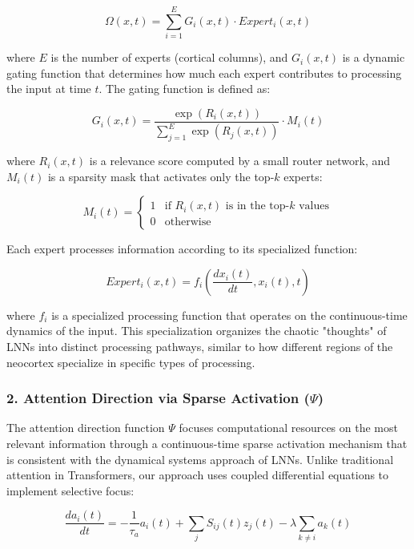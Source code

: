 \documentclass{article}
\begin{document}
\begin{equation}
\Omega(x, t) = \sum_{i=1}^{E} G_i(x, t) \cdot Expert_i(x, t)
\end{equation}

where $E$ is the number of experts (cortical columns), and $G_i(x, t)$ is a dynamic gating function that determines how much each expert contributes to processing the input at time $t$. The gating function is defined as:

\begin{equation}
G_i(x, t) = \frac{\exp(R_i(x, t))}{\sum_{j=1}^{E} \exp(R_j(x, t))} \cdot M_i(t)
\end{equation}

where $R_i(x, t)$ is a relevance score computed by a small router network, and $M_i(t)$ is a sparsity mask that activates only the top-$k$ experts:

\begin{equation}
M_i(t) = \begin{cases}
1 & \text{if } R_i(x, t) \text{ is in the top-$k$ values} \\
0 & \text{otherwise}
\end{cases}
\end{equation}

Each expert processes information according to its specialized function:

\begin{equation}
Expert_i(x, t) = f_i\left(\frac{dx_i(t)}{dt}, x_i(t), t\right)
\end{equation}

where $f_i$ is a specialized processing function that operates on the continuous-time dynamics of the input. This specialization organizes the chaotic "thoughts" of LNNs into distinct processing pathways, similar to how different regions of the neocortex specialize in specific types of processing.

\subsubsection{2. Attention Direction via Sparse Activation ($\Psi$)}
The attention direction function $\Psi$ focuses computational resources on the most relevant information through a continuous-time sparse activation mechanism that is consistent with the dynamical systems approach of LNNs. Unlike traditional attention in Transformers, our approach uses coupled differential equations to implement selective focus:

\begin{equation}
\frac{da_i(t)}{dt} = -\frac{1}{\tau_a}a_i(t) + \sum_j S_{ij}(t)z_j(t) - \lambda \sum_{k \neq i} a_k(t)
\end{equation}
\end{document}
